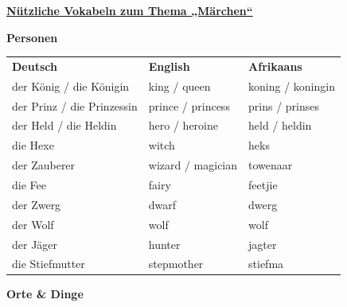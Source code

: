 \documentclass[12pt,a4paper]{article}
\begin{document}
\pagestyle{empty}

\begin{center}
    {\Large\textbf{\uline{Nützliche Vokabeln zum Thema „Märchen“}}}
\end{center}

\vspace{0.4cm}

\begin{center}
    {\large\textbf{Personen}}
\end{center}

\begin{tabular}{@{}p{5cm} p{4.5cm} p{4.5cm}@{}}
\textbf{Deutsch} & \textbf{English} & \textbf{Afrikaans} \\[4pt]

der König / die Königin
    & king / queen
    & koning / koningin \\

der Prinz / die Prinzessin
    & prince / princess
    & prins / prinses \\

der Held / die Heldin
    & hero / heroine
    & held / heldin \\

die Hexe
    & witch
    & heks \\

der Zauberer
    & wizard / magician
    & towenaar \\

die Fee
    & fairy
    & feetjie \\

der Zwerg
    & dwarf
    & dwerg \\

der Wolf
    & wolf
    & wolf \\

der Jäger
    & hunter
    & jagter \\

die Stiefmutter
    & stepmother
    & stiefma \\

\end{tabular}

\vspace{0.4cm}

\begin{center}
    {\large\textbf{Orte \& Dinge}}
\end{center}
\end{document}
